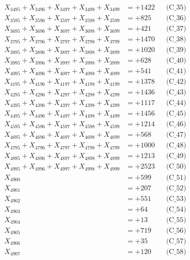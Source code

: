 \documentclass[a4paper,10pt]{article}
\begin{document}
{\begin{align}
X_{3495} + X_{3496} + X_{3497} + X_{3498} + X_{3499} &= +1422 && \text{(C\_35)} \\
\allowbreak
X_{3595} + X_{3596} + X_{3597} + X_{3598} + X_{3599} &= +825 && \text{(C\_36)} \\
X_{3695} + X_{3696} + X_{3697} + X_{3698} + X_{3699} &= +421 && \text{(C\_37)} \\
X_{3795} + X_{3796} + X_{3797} + X_{3798} + X_{3799} &= +1470 && \text{(C\_38)} \\
X_{3895} + X_{3896} + X_{3897} + X_{3898} + X_{3899} &= +1020 && \text{(C\_39)} \\
X_{3995} + X_{3996} + X_{3997} + X_{3998} + X_{3999} &= +628 && \text{(C\_40)} \\
\allowbreak
X_{4095} + X_{4096} + X_{4097} + X_{4098} + X_{4099} &= +541 && \text{(C\_41)} \\
X_{4195} + X_{4196} + X_{4197} + X_{4198} + X_{4199} &= +1378 && \text{(C\_42)} \\
X_{4295} + X_{4296} + X_{4297} + X_{4298} + X_{4299} &= +1436 && \text{(C\_43)} \\
X_{4395} + X_{4396} + X_{4397} + X_{4398} + X_{4399} &= +1117 && \text{(C\_44)} \\
X_{4495} + X_{4496} + X_{4497} + X_{4498} + X_{4499} &= +1456 && \text{(C\_45)} \\
\allowbreak
X_{4595} + X_{4596} + X_{4597} + X_{4598} + X_{4599} &= +1214 && \text{(C\_46)} \\
X_{4695} + X_{4696} + X_{4697} + X_{4698} + X_{4699} &= +568 && \text{(C\_47)} \\
X_{4795} + X_{4796} + X_{4797} + X_{4798} + X_{4799} &= +1000 && \text{(C\_48)} \\
X_{4895} + X_{4896} + X_{4897} + X_{4898} + X_{4899} &= +1213 && \text{(C\_49)} \\
X_{4995} + X_{4996} + X_{4997} + X_{4998} + X_{4999} &= +2523 && \text{(C\_50)} \\
\allowbreak
X_{4900} &= +599 && \text{(C\_51)} \\
X_{4901} &= +207 && \text{(C\_52)} \\
X_{4902} &= +551 && \text{(C\_53)} \\
X_{4903} &= +64 && \text{(C\_54)} \\
X_{4904} &= +13 && \text{(C\_55)} \\
\allowbreak
X_{4905} &= +719 && \text{(C\_56)} \\
X_{4906} &= +35 && \text{(C\_57)} \\
X_{4907} &= +120 && \text{(C\_58)} \\

\end{align}}
\end{document}
